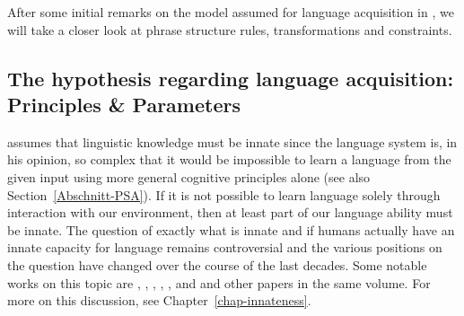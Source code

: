 After some initial remarks on the model assumed for language acquisition in \gbt, we will take a closer look at phrase structure rules,
transformations and constraints.


\subsection{The hypothesis regarding language acquisition: Principles \& Parameters}
\label{Abschnitt-GB-Paramater}

\citet[Section~I.8]{Chomsky65a} assumes that linguistic knowledge must be innate since the language system is,
in his opinion, so complex that it would be impossible to learn a language from the given input using more general cognitive principles alone
(see also Section~\ref{Abschnitt-PSA}). If it is not possible to learn language solely through interaction with our environment, then at least part of
our language ability must be innate. The question of exactly what is innate and if humans actually have an innate capacity for language remains
controversial and the various positions on the question have changed over the course of the last decades. Some notable works on this topic are , 
, , , , and
 and other papers in the same volume. For more on this discussion, see Chapter~\ref{chap-innateness}.


